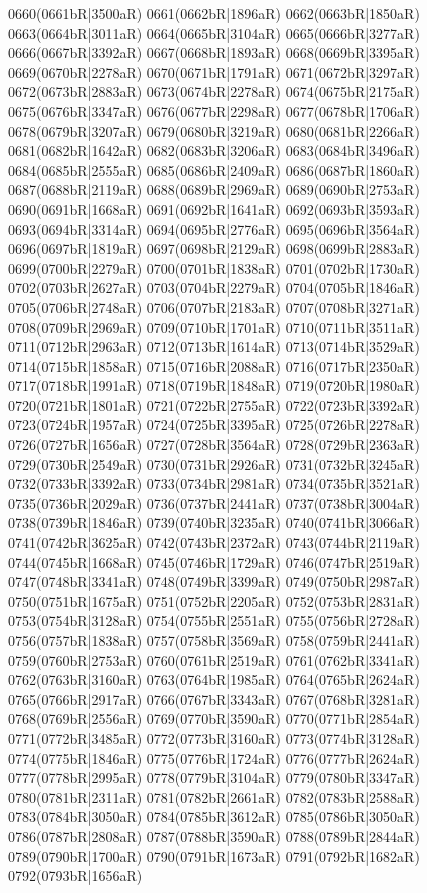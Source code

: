 0660(0661bR|3500aR) 0661(0662bR|1896aR) 0662(0663bR|1850aR) 0663(0664bR|3011aR) 0664(0665bR|3104aR) 0665(0666bR|3277aR) \\0666(0667bR|3392aR) 0667(0668bR|1893aR) 0668(0669bR|3395aR) 0669(0670bR|2278aR) 0670(0671bR|1791aR) 0671(0672bR|3297aR) 0672(0673bR|2883aR) 0673(0674bR|2278aR) 0674(0675bR|2175aR) \\0675(0676bR|3347aR) 0676(0677bR|2298aR) 0677(0678bR|1706aR) 0678(0679bR|3207aR) 0679(0680bR|3219aR) 0680(0681bR|2266aR) 0681(0682bR|1642aR) 0682(0683bR|3206aR) 0683(0684bR|3496aR) \\0684(0685bR|2555aR) 0685(0686bR|2409aR) 0686(0687bR|1860aR) 0687(0688bR|2119aR) 0688(0689bR|2969aR) 0689(0690bR|2753aR) 0690(0691bR|1668aR) 0691(0692bR|1641aR) 0692(0693bR|3593aR) \\0693(0694bR|3314aR) 0694(0695bR|2776aR) 0695(0696bR|3564aR) 0696(0697bR|1819aR) 0697(0698bR|2129aR) 0698(0699bR|2883aR) 0699(0700bR|2279aR) 0700(0701bR|1838aR) 0701(0702bR|1730aR) \\0702(0703bR|2627aR) 0703(0704bR|2279aR) 0704(0705bR|1846aR) 0705(0706bR|2748aR) 0706(0707bR|2183aR) 0707(0708bR|3271aR) 0708(0709bR|2969aR) 0709(0710bR|1701aR) 0710(0711bR|3511aR) \\0711(0712bR|2963aR) 0712(0713bR|1614aR) 0713(0714bR|3529aR) 0714(0715bR|1858aR) 0715(0716bR|2088aR) 0716(0717bR|2350aR) 0717(0718bR|1991aR) 0718(0719bR|1848aR) 0719(0720bR|1980aR) \\0720(0721bR|1801aR) 0721(0722bR|2755aR) 0722(0723bR|3392aR) 0723(0724bR|1957aR) 0724(0725bR|3395aR) 0725(0726bR|2278aR) 0726(0727bR|1656aR) 0727(0728bR|3564aR) 0728(0729bR|2363aR) \\0729(0730bR|2549aR) 0730(0731bR|2926aR) 0731(0732bR|3245aR) 0732(0733bR|3392aR) 0733(0734bR|2981aR) 0734(0735bR|3521aR) 0735(0736bR|2029aR) 0736(0737bR|2441aR) 0737(0738bR|3004aR) \\0738(0739bR|1846aR) 0739(0740bR|3235aR) 0740(0741bR|3066aR) 0741(0742bR|3625aR) 0742(0743bR|2372aR) 0743(0744bR|2119aR) 0744(0745bR|1668aR) 0745(0746bR|1729aR) 0746(0747bR|2519aR) \\0747(0748bR|3341aR) 0748(0749bR|3399aR) 0749(0750bR|2987aR) 0750(0751bR|1675aR) 0751(0752bR|2205aR) 0752(0753bR|2831aR) 0753(0754bR|3128aR) 0754(0755bR|2551aR) 0755(0756bR|2728aR) \\0756(0757bR|1838aR) 0757(0758bR|3569aR) 0758(0759bR|2441aR) 0759(0760bR|2753aR) 0760(0761bR|2519aR) 0761(0762bR|3341aR) 0762(0763bR|3160aR) 0763(0764bR|1985aR) 0764(0765bR|2624aR) \\0765(0766bR|2917aR) 0766(0767bR|3343aR) 0767(0768bR|3281aR) 0768(0769bR|2556aR) 0769(0770bR|3590aR) 0770(0771bR|2854aR) 0771(0772bR|3485aR) 0772(0773bR|3160aR) 0773(0774bR|3128aR) \\0774(0775bR|1846aR) 0775(0776bR|1724aR) 0776(0777bR|2624aR) 0777(0778bR|2995aR) 0778(0779bR|3104aR) 0779(0780bR|3347aR) 0780(0781bR|2311aR) 0781(0782bR|2661aR) 0782(0783bR|2588aR) \\0783(0784bR|3050aR) 0784(0785bR|3612aR) 0785(0786bR|3050aR) 0786(0787bR|2808aR) 0787(0788bR|3590aR) 0788(0789bR|2844aR) 0789(0790bR|1700aR) 0790(0791bR|1673aR) 0791(0792bR|1682aR) \\0792(0793bR|1656aR) 